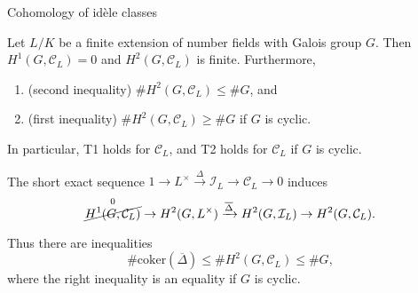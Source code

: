 \documentclass[10pt]{beamer}
\begin{document}
\begin{frame}[t]{Cohomology of id\`ele classes}

\begin{theorem}
Let $ L / K $ be a finite extension of number fields with Galois group $ G $. Then $ H^1(G, \mathcal{C}_L) = 0 $ and $ H^2(G, \mathcal{C}_L) $ is finite. \pause Furthermore,
\begin{enumerate}
\item (second inequality) $ \#H^2(G, \mathcal{C}_L) \le \#G $, and
\item (first inequality) $ \#H^2(G, \mathcal{C}_L) \ge \#G $ if $ G $ is cyclic.
\end{enumerate}
\end{theorem}

\pause

In particular, T1 holds for $ \mathcal{C}_L $, and T2 holds for $ \mathcal{C}_L $ if $ G $ is cyclic.

\pause

\vspace{0.5cm} The short exact sequence $ 1 \to L^\times \xrightarrow{\Delta} \mathcal{I}_L \to \mathcal{C}_L \to 0 $ induces
$$ \overset{0}{\cancel{H^1(G, \mathcal{C}_L)}} \to H^2(G, L^\times) \xrightarrow{\overline{\Delta}} H^2(G, \mathcal{I}_L) \to H^2(G, \mathcal{C}_L). $$

\pause

Thus there are inequalities
$$ \#\mathrm{coker}(\overline{\Delta}) \le \#H^2(G, \mathcal{C}_L) \le \#G, $$
where the right inequality is an equality if $ G $ is cyclic.

\end{frame}
\end{document}
